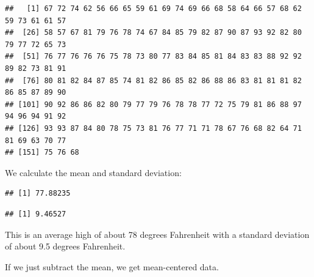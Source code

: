 \documentclass[
]{book}
\newenvironment{Shaded}{\begin{snugshade}}{\end{snugshade}}
\newcommand{\FunctionTok}[1]{\textcolor[rgb]{0.00,0.00,0.00}{#1}}
\newcommand{\NormalTok}[1]{#1}
\newcommand{\SpecialCharTok}[1]{\textcolor[rgb]{0.00,0.00,0.00}{#1}}
\begin{document}
\begin{verbatim}
##   [1] 67 72 74 62 56 66 65 59 61 69 74 69 66 68 58 64 66 57 68 62 59 73 61 61 57
##  [26] 58 57 67 81 79 76 78 74 67 84 85 79 82 87 90 87 93 92 82 80 79 77 72 65 73
##  [51] 76 77 76 76 76 75 78 73 80 77 83 84 85 81 84 83 83 88 92 92 89 82 73 81 91
##  [76] 80 81 82 84 87 85 74 81 82 86 85 82 86 88 86 83 81 81 81 82 86 85 87 89 90
## [101] 90 92 86 86 82 80 79 77 79 76 78 78 77 72 75 79 81 86 88 97 94 96 94 91 92
## [126] 93 93 87 84 80 78 75 73 81 76 77 71 71 78 67 76 68 82 64 71 81 69 63 70 77
## [151] 75 76 68
\end{verbatim}

We calculate the mean and standard deviation:

\begin{Shaded}
\end{Shaded}

\begin{verbatim}
## [1] 77.88235
\end{verbatim}

\begin{Shaded}
\end{Shaded}

\begin{verbatim}
## [1] 9.46527
\end{verbatim}

This is an average high of about 78 degrees Fahrenheit with a standard deviation of about 9.5 degrees Fahrenheit.

If we just subtract the mean, we get mean-centered data.

\begin{Shaded}
\end{Shaded}
\end{document}
